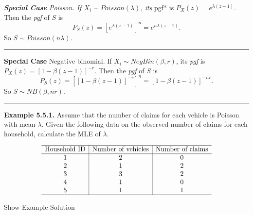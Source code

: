 \documentclass[]{book}
\theoremstyle{definition}
\theoremstyle{definition}
\theoremstyle{definition}
\theoremstyle{remark}
\begin{document}
\emph{\textbf{Special Case} Poisson. If \(X_i\sim Poisson(\lambda)\),
its }pgf* is \(P_X(z)=e^{\lambda(z-1)}\). Then the \emph{pgf} of \(S\)
is \[P_S(z)=[e^{\lambda(z-1)}]^n=e^{n\lambda(z-1)}.\] So
\(S\sim Poisson(n\lambda)\).

\begin{center}\rule{0.5\linewidth}{\linethickness}\end{center}

\textbf{Special Case} Negative binomial. If \(X_i\sim NegBin(\beta,r)\),
its \emph{pgf} is \(P_X(z)=[1-\beta(z-1)]^{-r}\). Then the \emph{pgf} of
\(S\) is \[P_S(z)=[[1-\beta(z-1)]^{-r}]^n=[1-\beta(z-1)]^{-nr}.\] So
\(S\sim NB(\beta,nr)\).

\begin{center}\rule{0.5\linewidth}{\linethickness}\end{center}

\textbf{Example 5.5.1.} Assume that the number of claims for each
vehicle is Poisson with mean \(\lambda\). Given the following data on
the observed number of claims for each household, calculate the MLE of
\(\lambda\).

\[\begin{matrix}
\begin{array}{c|c|c}
  \hline
  \text{Household ID} & \text{Number of vehicles} & \text{Number of claims} \\
  \hline
  1 & 2 & 0 \\
  2 & 1 & 2 \\
  3 & 3 & 2 \\
  4 & 1 & 0 \\
  5 & 1 & 1 \\
  \hline
\end{array}
\end{matrix}\]

Show Example Solution
\end{document}
